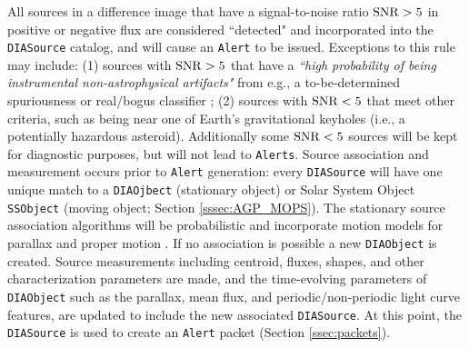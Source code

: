 All sources in a difference image that have a signal-to-noise ratio ${\rm SNR}>5$ in positive or negative flux are considered ``detected" and incorporated into the {\tt DIASource} catalog, and will cause an {\tt Alert} to be issued. Exceptions to this rule may include: (1) sources with ${\rm SNR} > 5$ that have a {\it ``high probability of being instrumental non-astrophysical artifacts"}  from e.g., a to-be-determined spuriousness or real/bogus classifier ; (2) sources with ${\rm SNR} < 5$ that meet other criteria, such as being near one of Earth's gravitational keyholes (i.e., a potentially hazardous asteroid). Additionally some ${\rm SNR} < 5$ sources will be kept for diagnostic purposes, but will not lead to {\tt Alerts}. Source association and measurement occurs prior to {\tt Alert} generation: every {\tt DIASource} will have one unique match to a {\tt DIAOjbect} (stationary object) or Solar System Object {\tt SSObject} (moving object; Section \ref{sssec:AGP_MOPS}). The stationary source association algorithms will be probabilistic and incorporate motion models for parallax and proper motion . If no association is possible a new {\tt DIAObject} is created. Source measurements including centroid, fluxes, shapes, and other characterization parameters  are made, and the time-evolving parameters of {\tt DIAObject} such as the parallax, mean flux, and periodic/non-periodic light curve features, are updated to include the new associated {\tt DIASource}. At this point, the {\tt DIASource} is used to create an {\tt Alert} packet (Section \ref{ssec:packets}).


